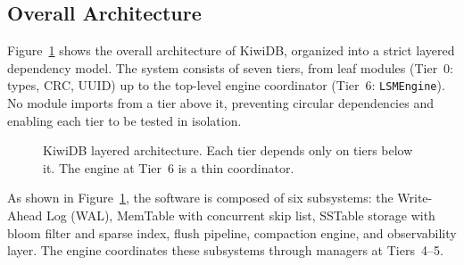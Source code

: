 \documentclass[conference]{IEEEtran}
\begin{document}
\subsection{Overall Architecture}

Figure~\ref{fig:kiwidb-arch} shows the overall architecture of KiwiDB, organized into a strict layered dependency model. The system consists of seven tiers, from leaf modules (Tier~0: types, CRC, UUID) up to the top-level engine coordinator (Tier~6: \texttt{LSMEngine}). No module imports from a tier above it, preventing circular dependencies and enabling each tier to be tested in isolation.

\begin{figure}[t]
\centering
{}
\caption{KiwiDB layered architecture. Each tier depends only on tiers below it. The engine at Tier~6 is a thin coordinator.}
\label{fig:kiwidb-arch}
\end{figure}

As shown in Figure~\ref{fig:kiwidb-arch}, the software is composed of six subsystems: the Write-Ahead Log (WAL), MemTable with concurrent skip list, SSTable storage with bloom filter and sparse index, flush pipeline, compaction engine, and observability layer. The engine coordinates these subsystems through managers at Tiers~4--5.
\end{document}
